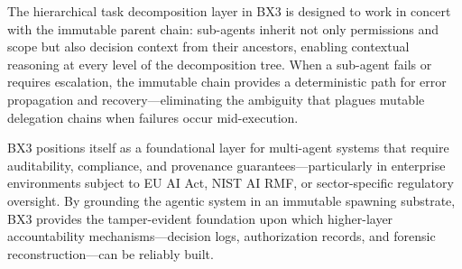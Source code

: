 The hierarchical task decomposition layer in BX3 is designed to work in concert with the immutable parent chain: sub-agents inherit not only permissions and scope but also decision context from their ancestors, enabling contextual reasoning at every level of the decomposition tree. When a sub-agent fails or requires escalation, the immutable chain provides a deterministic path for error propagation and recovery—eliminating the ambiguity that plagues mutable delegation chains when failures occur mid-execution.

BX3 positions itself as a foundational layer for multi-agent systems that require auditability, compliance, and provenance guarantees—particularly in enterprise environments subject to EU AI Act, NIST AI RMF, or sector-specific regulatory oversight. By grounding the agentic system in an immutable spawning substrate, BX3 provides the tamper-evident foundation upon which higher-layer accountability mechanisms—decision logs, authorization records, and forensic reconstruction—can be reliably built.

